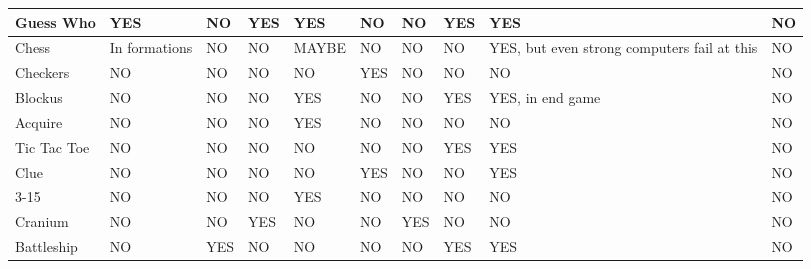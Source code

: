\documentclass{acm_proc_article-sp}
\begin{document}
\begin{sidewaystable}[htbp]
\begin{tabular}{|p{1.5cm}||p{1.5cm}|p{2.5cm}|p{2.5cm}|p{2.7cm}|p{2cm}|p{1.5cm}|p{2cm}|p{3.5cm}|p{1.5cm}|}
    Guess Who 
      & \cellcolor{blue!25}YES 
      & NO 
      & \cellcolor{blue!25}YES 
      & \cellcolor{blue!25}YES 
      & NO 
      & NO 
      & \cellcolor{blue!25}YES 
      & \cellcolor{blue!25}YES 
      & NO \\ \hline

    Chess 
      & In formations 
      & NO 
      & NO 
      & MAYBE 
      & NO 
      & NO 
      & NO 
      & \cellcolor{blue!25}YES, but even strong computers fail at this 
      & NO \\ \hline

    Checkers 
      & NO 
      & NO 
      & NO 
      & NO 
      & \cellcolor{blue!25}YES 
      & NO 
      & NO 
      & NO 
      & NO \\ \hline

    Blockus 
      & NO 
      & NO 
      & NO 
      & \cellcolor{blue!25}YES 
      & NO 
      & NO 
      & \cellcolor{blue!25}YES 
      & \cellcolor{blue!25}YES, in end game 
      & NO \\ \hline


    Acquire 
      & NO 
      & NO 
      & NO 
      & \cellcolor{blue!25}YES 
      & NO 
      & NO 
      & NO 
      & NO 
      & NO \\ \hline

    Tic Tac Toe
      & NO 
      & NO 
      & NO 
      & NO 
      & NO 
      & NO 
      & \cellcolor{blue!25}YES 
      & \cellcolor{blue!25}YES 
      & NO \\ \hline

    Clue
      & NO 
      & NO 
      & NO 
      & NO 
      & \cellcolor{blue!25}YES 
      & NO 
      & NO 
      & \cellcolor{blue!25}YES 
      & NO \\ \hline

    3-15
      & NO 
      & NO 
      & NO 
      & \cellcolor{blue!25}YES 
      & NO 
      & NO 
      & NO 
      & NO 
      & NO \\ \hline

    Cranium
      & NO 
      & NO 
      & \cellcolor{blue!25}YES 
      & NO 
      & NO 
      & \cellcolor{blue!25}YES 
      & NO 
      & NO 
      & NO \\ \hline

    Battleship 
      & NO 
      & \cellcolor{blue!25}YES 
      & NO 
      & NO 
      & NO 
      & NO 
      & \cellcolor{blue!25}YES 
      & \cellcolor{blue!25}YES 
      & NO \\ \hline


\end{tabular}
\end{sidewaystable}
\end{document}
